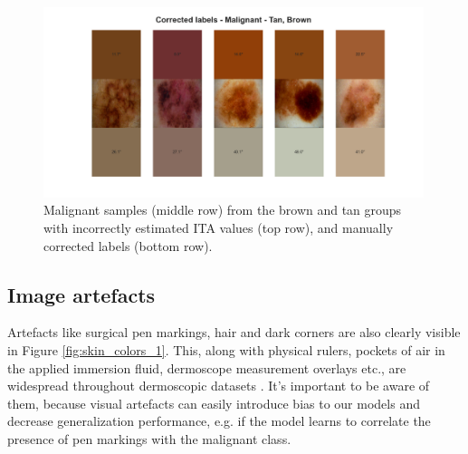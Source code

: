 \begin{figure}[htpb]
     \centering
     \includegraphics[width=0.99\textwidth]{figures/eda/Corrected - Malignant, Tan_Brown.png}
     \caption{Malignant samples (middle row) from the brown and tan groups with incorrectly estimated ITA values (top row), and manually corrected labels (bottom row).}
     \label{fig:ita_fixed}
\end{figure}

\subsection{Image artefacts}
Artefacts like surgical pen markings, hair and dark corners are also clearly visible in Figure \ref{fig:skin_colors_1}. This, along with physical rulers, pockets of air in the applied immersion fluid, dermoscope measurement overlays etc., are widespread throughout dermoscopic datasets \cite{isic_recommendations}. It's important to be aware of them, because visual artefacts can easily introduce bias to our models and decrease generalization performance, e.g. if the model learns to correlate the presence of pen markings with the malignant class. 
